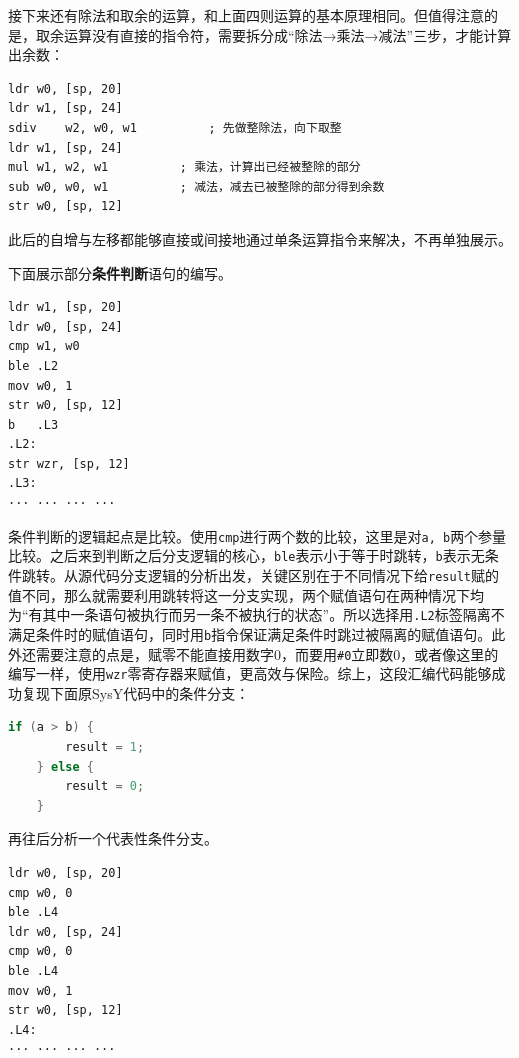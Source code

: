 \documentclass[UTF8,a4paper,10pt]{ctexart}
\begin{document}
接下来还有除法和取余的运算，和上面四则运算的基本原理相同。但值得注意的是，取余运算没有直接的指令符，需要拆分成“除法→乘法→减法”三步，才能计算出余数：

\begin{lstlisting}[frame=trbl,language={[x86masm]Assembler}]
ldr	w0, [sp, 20]
ldr	w1, [sp, 24]
sdiv	w2, w0, w1          ; 先做整除法，向下取整
ldr	w1, [sp, 24]
mul	w1, w2, w1          ; 乘法，计算出已经被整除的部分
sub	w0, w0, w1          ; 减法，减去已被整除的部分得到余数
str	w0, [sp, 12]
\end{lstlisting}

此后的自增与左移都能够直接或间接地通过单条运算指令来解决，不再单独展示。

\vspace{1em}

下面展示部分\textbf{条件判断}语句的编写。

\begin{lstlisting}[frame=trbl,language={[x86masm]Assembler}]
ldr	w1, [sp, 20]
ldr	w0, [sp, 24]
cmp	w1, w0
ble	.L2
mov	w0, 1
str	w0, [sp, 12]
b	.L3
.L2:
str	wzr, [sp, 12]
.L3:
··· ··· ··· ···
\end{lstlisting}


条件判断的逻辑起点是比较。使用\texttt{cmp}进行两个数的比较，这里是对\texttt{a, b}两个参量比较。之后来到判断之后分支逻辑的核心，\texttt{ble}表示小于等于时跳转，\texttt{b}表示无条件跳转。从源代码分支逻辑的分析出发，关键区别在于不同情况下给\texttt{result}赋的值不同，那么就需要利用跳转将这一分支实现，两个赋值语句在两种情况下均为“有其中一条语句被执行而另一条不被执行的状态”。所以选择用\texttt{.L2}标签隔离不满足条件时的赋值语句，同时用\texttt{b}指令保证满足条件时跳过被隔离的赋值语句。此外还需要注意的点是，赋零不能直接用数字0，而要用\texttt{\#0}立即数0，或者像这里的编写一样，使用\texttt{wzr}零寄存器来赋值，更高效与保险。综上，这段汇编代码能够成功复现下面原SysY代码中的条件分支：

\begin{lstlisting}[frame=trbl,language={C}]
    if (a > b) {
        result = 1;
    } else {
        result = 0;
    }
\end{lstlisting}

再往后分析一个代表性条件分支。

\begin{lstlisting}[frame=trbl,language={[x86masm]Assembler}]
ldr	w0, [sp, 20]
cmp	w0, 0
ble	.L4
ldr	w0, [sp, 24]
cmp	w0, 0
ble	.L4
mov	w0, 1
str	w0, [sp, 12]
.L4:
··· ··· ··· ···
\end{lstlisting}
\end{document}
